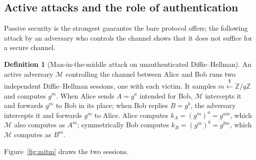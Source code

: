 \documentclass[11pt,a4paper]{article}
\theoremstyle{definition}
\newtheorem{definition}[theorem]{Definition}
\theoremstyle{remark}
\newcommand{\Z}{\ensuremath{\mathbb{Z}}}
\begin{document}
\subsection{Active attacks and the role of authentication}
\label{keyagreement:subsec:active}

Passive security is the strongest guarantee the bare protocol offers;
the following attack by an adversary who controls the channel shows
that it does not suffice for a secure channel.

\begin{definition}[Man-in-the-middle attack on unauthenticated
Diffie--Hellman]
\label{keyagreement:def:mitm}
An active adversary \(\mathcal{M}\) controlling the channel between
Alice and Bob runs two independent Diffie--Hellman sessions, one with
each victim. It samples \(m \xleftarrow{\$} \Z/q\Z\) and computes
\(g^{m}\). When Alice sends \(A = g^{a}\) intended for Bob,
\(\mathcal{M}\) intercepts it and forwards \(g^{m}\) to Bob in its
place; when Bob replies \(B = g^{b}\), the adversary intercepts it
and forwards \(g^{m}\) to Alice. Alice computes
\(k_{A} = (g^{m})^{a} = g^{am}\), which \(\mathcal{M}\) also computes
as \(A^{m}\); symmetrically Bob computes
\(k_{B} = (g^{m})^{b} = g^{bm}\), which \(\mathcal{M}\) computes as
\(B^{m}\).
\end{definition}

Figure~\ref{fig:mitm} draws the two sessions.
\end{document}

